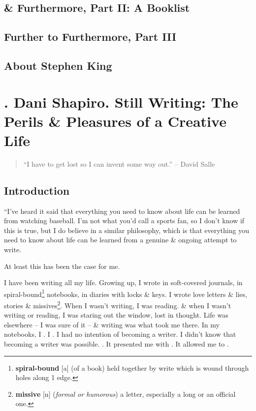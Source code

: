 \documentclass[oneside]{book}
\numberwithin{equation}{section}
\begin{document}

\section{\& Furthermore, Part II: A Booklist}


\section{Further to Furthermore, Part III}


\section{About Stephen King}


\chapter{\cite{Shapiro2014}. Dani Shapiro. Still Writing: The Perils \& Pleasures of a Creative Life}

\begin{quotation}
	``I have to get lost so I can invent some way out.'' -- David Salle
\end{quotation}

\section*{Introduction}
``I've heard it said that everything you need to know about life can be learned from watching baseball. I'm not what you'd call a sports fan, so I don't know if this is true, but I do believe in a similar philosophy, which is that everything you need to know about life can be learned from a genuine \& ongoing attempt to write.

At least this has been the case for me.

I have been writing all my life. Growing up, I wrote in soft-covered journals, in spiral-bound\footnote{\textbf{spiral-bound} [a] (of a book) held together by write which is wound through holes along 1 edge.} notebooks, in diaries with locks \& keys. I wrote love letters \& lies, stories \& missives\footnote{\textbf{missive} [n] (\textit{formal or humorous}) a letter, especially a long or an official one.}. When I wasn't writing, I was reading. \& when I wasn't writing or reading, I was staring out the window, lost in thought. Life was elsewhere -- I was sure of it -- \& writing was what took me there. In my notebooks, I . I . I had no intention of becoming a writer. I didn't know that becoming a writer was possible. . It presented me with . It allowed me to .
\end{document}
